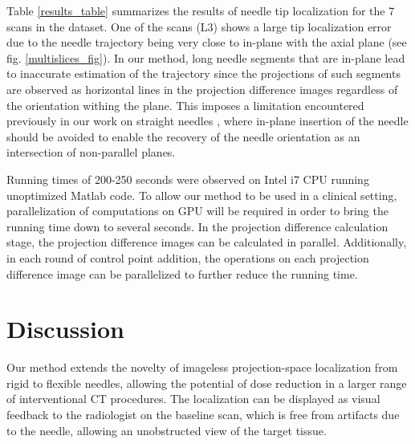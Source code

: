 \documentclass[letterpaper, 11 pt, conference]{ieeeconf} %
\begin{document}
Table \ref{results_table} summarizes the results of needle tip localization for the 7 scans in the dataset. One of the scans (L3) shows a large tip localization error due to the needle trajectory being very close to in-plane with the axial plane (see fig. \ref{multislices_fig}). In our method, long needle segments that are in-plane lead to inaccurate estimation of the trajectory since the projections of such segments are observed as horizontal lines in the projection difference images regardless of the orientation withing the plane. This imposes a limitation encountered previously in our work on straight needles \cite{medan2017reduced}, where in-plane insertion of the needle should be avoided to enable the recovery of the needle orientation as an intersection of non-parallel planes.

Running times of 200-250 seconds were observed on Intel i7 CPU running unoptimized Matlab code. To allow our method to be used in a clinical setting, parallelization of computations on GPU will be required in order to bring the running time down to several seconds. In the projection difference calculation stage, the projection difference images can be calculated in parallel. Additionally, in each round of control point addition, the operations on each projection difference image can be parallelized to further reduce the running time.

\section{Discussion}
Our method extends the novelty of imageless projection-space localization from rigid to flexible needles, allowing the potential of dose reduction in a larger range of interventional CT procedures. The localization can be displayed as visual feedback to the radiologist on the baseline scan, which is free from artifacts due to the needle, allowing an unobstructed view of the target tissue.
\end{document}
